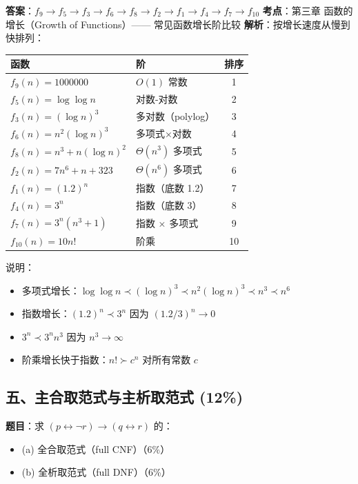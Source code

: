 \documentclass[10pt,a4paper,openany]{ctexbook}
\theoremstyle{definition}
\theoremstyle{remark}
\begin{document}
\textbf{答案}：$f_9 \to f_5 \to f_3 \to f_6 \to f_8 \to f_2 \to f_1 \to f_4 \to f_7 \to f_{10}$
\textbf{考点}：第三章 函数的增长（Growth of Functions）—— 常见函数增长阶比较
\textbf{解析}：按增长速度从慢到快排列：
\begin{center}
\begin{tabular}{llc}
\hline
函数 & 阶 & 排序 \\ \hline
$f_9(n) = 1000000$ & $O(1)$ 常数 & 1 \\
$f_5(n) = \log \log n$ & 对数-对数 & 2 \\
$f_3(n) = (\log n)^3$ & 多对数（polylog） & 3 \\
$f_6(n) = n^2 (\log n)^3$ & 多项式×对数 & 4 \\
$f_8(n) = n^3 + n(\log n)^2$ & $\Theta(n^3)$ 多项式 & 5 \\
$f_2(n) = 7n^6 + n + 323$ & $\Theta(n^6)$ 多项式 & 6 \\
$f_1(n) = (1.2)^n$ & 指数（底数 1.2） & 7 \\
$f_4(n) = 3^n$ & 指数（底数 3） & 8 \\
$f_7(n) = 3^n(n^3 + 1)$ & 指数 × 多项式 & 9 \\
$f_{10}(n) = 10n!$ & 阶乘 & 10 \\
\hline
\end{tabular}

\end{center}

说明：
\begin{itemize}
\item 多项式增长：$\log\log n \prec (\log n)^3 \prec n^2(\log n)^3 \prec n^3 \prec n^6$
\item 指数增长：$(1.2)^n \prec 3^n$ 因为 $(1.2/3)^n \to 0$
\item $3^n \prec 3^n n^3$ 因为 $n^3 \to \infty$
\item 阶乘增长快于指数：$n! \succ c^n$ 对所有常数 $c$

\end{itemize}

\vspace{-2pt}

\subsection{五、主合取范式与主析取范式 (12\%)}

\textbf{题目}：求 $(p \leftrightarrow \neg r) \to (q \leftrightarrow r)$ 的：
\begin{itemize}
\item (a) 全合取范式（full CNF）（6\%）
\item (b) 全析取范式（full DNF）（6\%）

\end{itemize}
\end{document}
